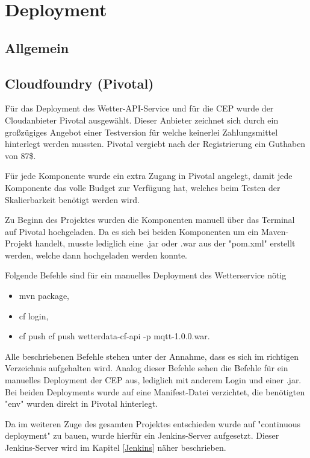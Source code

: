 \section{Deployment}
\subsection{Allgemein}
\subsection{Cloudfoundry (Pivotal)}
Für das Deployment des Wetter-API-Service und für die CEP wurde der Cloudanbieter Pivotal ausgewählt. Dieser Anbieter zeichnet sich durch ein großzügiges Angebot einer Testversion für welche keinerlei Zahlungsmittel hinterlegt werden mussten. Pivotal vergiebt nach der Registrierung ein Guthaben von 87\$. 

Für jede Komponente wurde ein extra Zugang in Pivotal angelegt, damit jede Komponente das volle Budget zur Verfügung hat, welches beim Testen der Skalierbarkeit benötigt werden wird. 

Zu Beginn des Projektes wurden die Komponenten manuell über das Terminal auf Pivotal hochgeladen. Da es sich bei beiden Komponenten um ein Maven-Projekt handelt, musste lediglich eine .jar oder .war aus der "pom.xml" erstellt werden, welche dann hochgeladen werden konnte. 

Folgende Befehle sind für ein manuelles Deployment des Wetterservice nötig 

\begin{itemize}
\item mvn package,
\item cf login, 
\item cf push cf push wetterdata-cf-api -p mqtt-1.0.0.war.
\end{itemize}
Alle beschriebenen Befehle stehen unter der Annahme, dass es sich im richtigen Verzeichnis aufgehalten wird. Analog dieser Befehle  sehen die Befehle für ein manuelles Deployment der CEP aus, lediglich mit anderem Login und einer .jar. Bei beiden Deployments wurde auf eine Manifest-Datei verzichtet, die benötigten "env" wurden direkt in Pivotal hinterlegt. 

Da im weiteren Zuge des gesamten Projektes entschieden wurde auf "continuous deployment" zu bauen, wurde hierfür ein Jenkins-Server aufgesetzt. Dieser Jenkins-Server wird im Kapitel \ref{Jenkins} näher beschrieben. 

